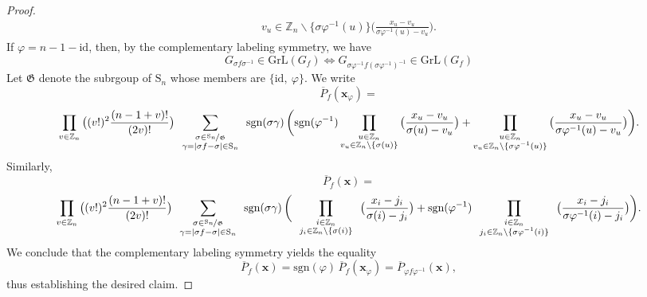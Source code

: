 \begin{proof}
\begin{align*}
{{v_{u}\in\mathbb{Z}_{n}\backslash\{\sigma\varphi^{-1}(u)\}
}
}\bigg(\frac{x_{u}-v_{u}}{\sigma\varphi^{-1}(u)-v_{u}}\bigg).
\end{align*}
If $\varphi=n-1-\text{id}$, then,
by the complementary labeling symmetry, we have 
\[
G_{\sigma f\sigma^{-1}}\in\text{GrL}\left(G_{f}\right)\Longleftrightarrow G_{\sigma\varphi^{-1}f(\sigma\varphi^{-1})^{-1}}\in\text{GrL}\left(G_{f}\right)
\]
Let $\mathfrak{G}$ denote the subrgoup of $\text{S}_n$ whose members are $\big\{\text{id},\ \varphi\big\}$. We write
\[
\overline{P}_f(\mathbf{x}_\varphi)=
\]
\[
\prod_{v\in\mathbb{Z}_{n}}\big((v!)^{2}\frac{(n-1+v)!}{(2v)!}\big)\sum_{\begin{array}{c}
\substack{\sigma\in\nicefrac{\text{S}_{n}}{\mathfrak{G}}\\
\gamma=\left|\sigma f-\sigma\right|\in\text{S}_{n}
}
\end{array}}\text{sgn}(\sigma\gamma)\,\bigg(\text{sgn}(\varphi^{-1})\prod_{\substack{u\in\mathbb{Z}_{n}\\
v_{u}\in\mathbb{Z}_{n}\backslash\{\sigma(u)\}
}
}\big(\frac{x_{u}-v_{u}}{\sigma(u)-v_{u}}\big)+\prod_{\substack{u\in\mathbb{Z}_{n}\\
v_{u}\in\mathbb{Z}_{n}\backslash\{\sigma\varphi^{-1}(u)\}
}
}\big(\frac{x_{u}-v_{u}}{\sigma\varphi^{-1}(u)-v_{u}}\big)\bigg).
\]
Similarly, 
\[
\overline{P}_f(\mathbf{x})=
\]
\[
\prod_{v\in\mathbb{Z}_{n}}\big((v!)^{2}\frac{(n-1+v)!}{(2v)!}\big)\sum_{\begin{array}{c}
\substack{\sigma\in\nicefrac{\text{S}_{n}}{\mathfrak{G}}\\
\gamma=\left|\sigma f-\sigma\right|\in\text{S}_{n}
}
\end{array}}\text{sgn}(\sigma\gamma)\,\bigg(\prod_{\begin{array}{c}
\substack{i\in\mathbb{Z}_{n}\\
j_{i}\in\mathbb{Z}_{n}\backslash\{\sigma(i)\}
}
\end{array}}\big(\frac{x_{i}-j_{i}}{\sigma(i)-j_{i}}\big)+\text{sgn}(\varphi^{-1})\prod_{\begin{array}{c}
\substack{i\in\mathbb{Z}_{n}\\
j_{i}\in\mathbb{Z}_{n}\backslash\{\sigma\varphi^{-1}(i)\}
}
\end{array}}\big(\frac{x_{i}-j_{i}}{\sigma\varphi^{-1}(i)-j_{i}}\big)\bigg).
\]
We conclude that the complementary labeling symmetry yields the equality
\[
\overline{P}_f(\mathbf{x})=\text{sgn}(\varphi)\,\overline{P}_f(\mathbf{x}_{\varphi})=\overline{P}_{\varphi f\varphi^{-1}}(\mathbf{x}),
\]
thus establishing the desired claim.
\end{proof}
